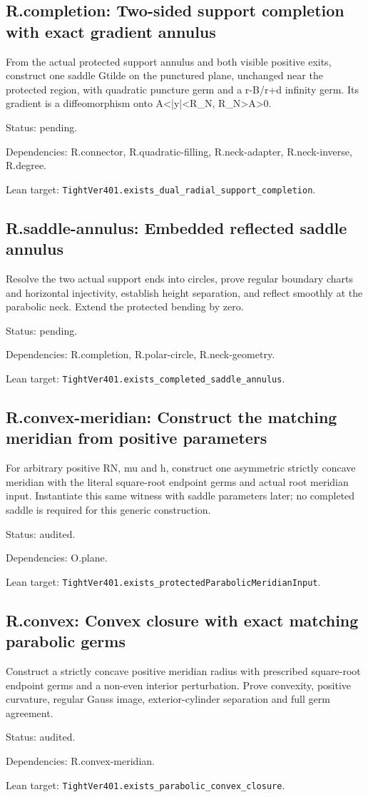 \documentclass{article}
\begin{document}
\subsection*{R.completion: Two-sided support completion with exact gradient annulus}
From the actual protected support annulus and both visible positive exits, construct one saddle Gtilde on the punctured plane, unchanged near the protected region, with quadratic puncture germ and a r-B/r+d infinity germ. Its gradient is a diffeomorphism onto A<|y|<R\_N, R\_N>A>0.
\par Status: pending.
\par Dependencies: R.connector, R.quadratic-filling, R.neck-adapter, R.neck-inverse, R.degree.
\par Lean target: \texttt{TightVer401.exists\_dual\_radial\_support\_completion}.
\subsection*{R.saddle-annulus: Embedded reflected saddle annulus}
Resolve the two actual support ends into circles, prove regular boundary charts and horizontal injectivity, establish height separation, and reflect smoothly at the parabolic neck. Extend the protected bending by zero.
\par Status: pending.
\par Dependencies: R.completion, R.polar-circle, R.neck-geometry.
\par Lean target: \texttt{TightVer401.exists\_completed\_saddle\_annulus}.
\subsection*{R.convex-meridian: Construct the matching meridian from positive parameters}
For arbitrary positive RN, mu and h, construct one asymmetric strictly concave meridian with the literal square-root endpoint germs and actual root meridian input. Instantiate this same witness with saddle parameters later; no completed saddle is required for this generic construction.
\par Status: audited.
\par Dependencies: O.plane.
\par Lean target: \texttt{TightVer401.exists\_protectedParabolicMeridianInput}.
\subsection*{R.convex: Convex closure with exact matching parabolic germs}
Construct a strictly concave positive meridian radius with prescribed square-root endpoint germs and a non-even interior perturbation. Prove convexity, positive curvature, regular Gauss image, exterior-cylinder separation and full germ agreement.
\par Status: audited.
\par Dependencies: R.convex-meridian.
\par Lean target: \texttt{TightVer401.exists\_parabolic\_convex\_closure}.
\end{document}
